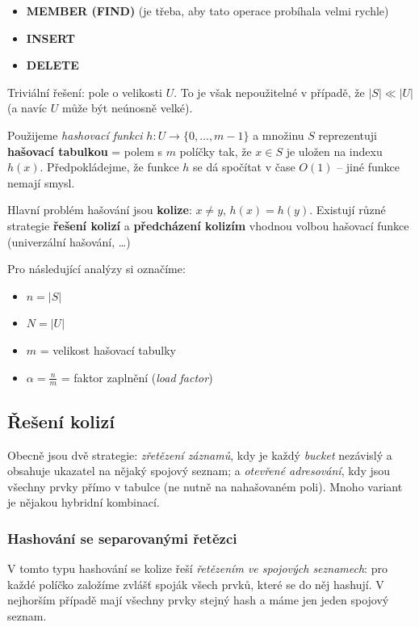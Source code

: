 \documentclass[11pt]{report} %
\numberwithin{equation}{section}
\begin{document}
\begin{itemize}	
	\item \textbf{MEMBER (FIND)} (je třeba, aby tato operace probíhala velmi rychle)
	\item \textbf{INSERT}
	\item \textbf{DELETE}
\end{itemize}

Triviální řešení: pole o velikosti $U$. To je však nepoužitelné v případě, že $|S| \ll |U|$ (a navíc $U$ může být neúnosně velké).

Použijeme \emph{hashovací funkci} $h : U \to \{0, \dots, m-1 \}$ a množinu $S$ reprezentuji \textbf{hašovací tabulkou} = polem s $m$ políčky tak, že $x\in S$ je uložen na indexu $h(x)$. Předpokládejme, že funkce $h$ se dá spočítat v čase
$O(1)$ -- jiné funkce nemají smysl.

Hlavní problém hašování jsou \textbf{kolize}: $x\neq y$, $h(x) = h(y)$. Existují různé strategie \textbf{řešení kolizí} a \textbf{předcházení kolizím} vhodnou volbou hašovací funkce (univerzální hašování, \dots)

Pro následující analýzy si označíme:

\begin{itemize}
	\item $n = |S|$
	\item $N = |U|$
	\item $m$ = velikost hašovací tabulky
	\item $\alpha=\frac{n}{m}$ = faktor zaplnění (\textit{load factor})
\end{itemize}

\subsection{Řešení kolizí}
Obecně jsou dvě strategie: \textit{zřetězení záznamů}, kdy je každý \textit{bucket} nezávislý a obsahuje ukazatel na nějaký spojový seznam; a \textit{otevřené adresování}, kdy jsou všechny prvky přímo v tabulce (ne nutně na nahašovaném poli). Mnoho variant je nějakou hybridní kombinací.

\subsubsection{Hashování se separovanými řetězci}
V tomto typu hashování se kolize řeší \emph{řetězením ve spojových seznamech}: pro každé políčko založíme zvlášť spoják všech prvků, které se do něj hashují. V nejhorším případě mají všechny prvky stejný hash a máme jen jeden spojový seznam.
\end{document}
